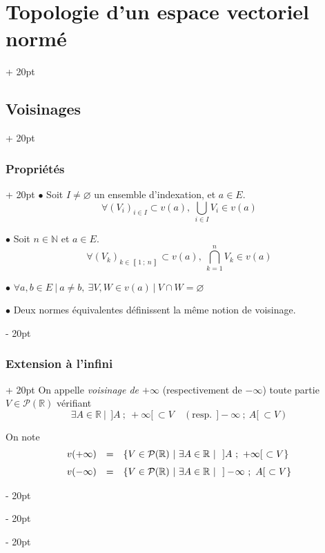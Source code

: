 \documentclass[a4paper, 12pt, twoside]{article}
\newcommand{\N}{\mathbb{N}} %
\newcommand{\R}{\mathbb{R}} %
\newcommand{\nset}[2]{\left\llbracket #1\ ;\ #2 \right\rrbracket}
\newcommand{\lr}[1]{\left( #1 \right)}
\newcommand{\set}[1]{\left\{ #1 \right\}}
\newcommand{\ind}[1][20pt]{\advance\leftskip + #1}
\newcommand{\deind}[1][20pt]{\advance\leftskip - #1}
\newenvironment{indt}[2][20pt]{#2 \par \ind[#1]}{\par \deind} %
\begin{document}
\begin{indt}{\section{Topologie d'un espace vectoriel normé}}
\begin{indt}{\subsection{Voisinages}}
\begin{indt}{\subsubsection{Propriétés}}
                $\bullet$ Soit $I \neq \varnothing$ un ensemble d'indexation, et $a \in E$.
                \[
                    \forall \lr{V_i}_{i \in I} \subset v(a),\
                    \bigcup_{i \in I} V_i \in v(a)
                \]

                $\bullet$ Soit $n \in \N$ et $a \in E$.
                \[
                    \forall \!\lr{V_k}_{k \in \nset 1 n} \subset v(a),\
                    \bigcap_{k = 1}^n V_k \in v(a)
                \]

                $\bullet$ $
                    \forall a, b \in E\ |\ a \neq b,\
                    \exists V, W \in v(a)\ |\ V \cap W = \varnothing
                $

                $\bullet$ Deux normes équivalentes définissent la même notion de voisinage.
            \end{indt}

            \vspace{12pt}
            
            \begin{indt}{\subsubsection{Extension à l'infini}}
                On appelle \emph{voisinage de $+\infty$} (respectivement de $-\infty$) toute partie $V \in \mathcal P(\R)$ vérifiant
                \[
                    \exists A \in \R\ |\ \ ]A\ ;\ +\infty[\ \subset V
                    \quad (\text{resp.}\ \ ] -\!\infty\ ;\ A[\ \subset V)
                \]

                On note
                \[
                    \begin{array}{rcl}
                        v(+\infty)
                        &=&
                        \set{V \in \mathcal P(\R)\ |\ \exists A \in \R\ |\ \ ]A\ ;\ +\infty[\ \subset V}
                        \vspace{6pt}
                        \\
                        v(-\infty)
                        &=&
                        \set{V \in \mathcal P(\R)\ |\ \exists A \in \R\ |\ \ ] -\!\infty\ ;\ A[\ \subset V}
                    \end{array}
                \]
            \end{indt}
        \end{indt}

        \vspace{12pt}
        

\end{indt}
\end{document}
